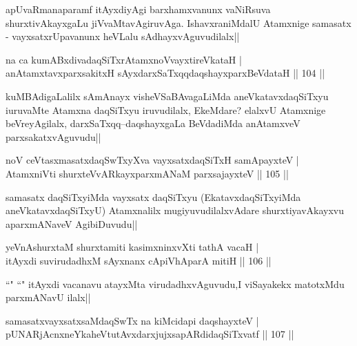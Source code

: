 \begin{artha}
apUvaRmanaparamf itAyxdiyAgi barxhamxvanunx vaNiRsuva shurxtivAkayxgaLu jiVvaMtavAgiruvAga. IshavxraniMdalU Atamxnige samasatx - vayxsatxrUpavanunx heVLalu sAdhayxvAguvudilalx||
\end{artha}


\begin{shl}
na ca kumABxdivadaqSiTxrAtamxnoV\s vayxtireVkataH |\\
anAtamxtavxparxsakitxH sAyxdarxSaTxqqdaqshayxparxBeVdataH \hfill || 104 ||
\end{shl}

\begin{artha}
kuMBAdigaLalilx sAmAnayx visheVSaBAvagaLiMda aneVkatavxdaqSiTxyu iuruvaMte Atamxna daqSiTxyu iruvudilalx, EkeMdare? elalxvU Atamxnige beVreyAgilalx, darxSaTxqq--daqshayxgaLa BeVdadiMda anAtamxveV parxsakatxvAguvudu||
\end{artha}


\begin{shl}
noV ceVtasxmasatxdaqSwTxyXva vayxsatxdaqSiTxH samApayxteV |\\
AtamxniVti shurxteVvARkayxparxmANaM parxsajayxteV \hfill || 105 ||
\end{shl}

\begin{artha}
samasatx daqSiTxyiMda vayxsatx daqSiTxyu (EkatavxdaqSiTxyiMda aneVkatavxdaqSiTxyU) Atamxnalilx mugiyuvudilalxvAdare shurxtiyavAkayxvu aparxmANaveV AgibiDuvudu||
\end{artha}

\begin{shl}
yeVnAshurxtaM shurxtamiti kasimxninxvXti tathA vacaH |\\
itAyxdi suvirudadhxM sAyxnanx cApiVhAparA mitiH \hfill || 106 ||
\end{shl}

\begin{artha}
``\stext" ``\stext" itAyxdi vacanavu atayxMta virudadhxvAguvudu,I viSayakekx matotxMdu 
parxmANavU ilalx||
\end{artha}


\begin{shl}
samasatxvayxsatxsaMdaqSwTx na kiMcidapi daqshayxteV |\\
pUNARjAcnxneYkaheVtutAvxdarxjujxsapARdidaqSiTxvatf \hfill || 107 ||
\end{shl}

